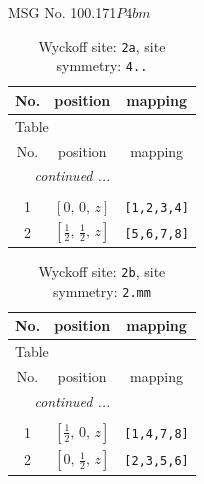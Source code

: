 \documentclass[fleqn,8pt]{jsarticle}
\begin{document}
\setcounter{MaxMatrixCols}{32}

\renewcommand{\tablename}{Table~}
\renewcommand{\figurename}{Figure~}
\begin{center}
\LARGE
MSG No. 100.171\quad$P4bm$
\end{center}
\renewcommand{\arraystretch}{1.2}
\begin{longtable}{ccc}
\caption{Wyckoff site: {\tt 2a}, site symmetry: {\tt 4..}}
 \\
 \hline \hline
No. & position & mapping \\ \hline \endfirsthead

\multicolumn{2}{l}{\tablename\ \thetable{}} \\
 \hline \hline
No. & position & mapping \\ \hline \endhead

 \hline \hline
\multicolumn{2}{r}{\footnotesize\it continued ...} \\ \endfoot

 \hline \hline
\multicolumn{2}{r}{} \\ \endlastfoot

1 & $\left[ 0,\, 0,\, z \right]$ & {\tt [1,2,3,4]} \\ \hline
2 & $\left[ \frac{1}{2},\, \frac{1}{2},\, z \right]$ & {\tt [5,6,7,8]} \\
\end{longtable}
\renewcommand{\arraystretch}{1.2}
\begin{longtable}{ccc}
\caption{Wyckoff site: {\tt 2b}, site symmetry: {\tt 2.mm}}
 \\
 \hline \hline
No. & position & mapping \\ \hline \endfirsthead

\multicolumn{2}{l}{\tablename\ \thetable{}} \\
 \hline \hline
No. & position & mapping \\ \hline \endhead

 \hline \hline
\multicolumn{2}{r}{\footnotesize\it continued ...} \\ \endfoot

 \hline \hline
\multicolumn{2}{r}{} \\ \endlastfoot

1 & $\left[ \frac{1}{2},\, 0,\, z \right]$ & {\tt [1,4,7,8]} \\ \hline
2 & $\left[ 0,\, \frac{1}{2},\, z \right]$ & {\tt [2,3,5,6]} \\
\end{longtable}
\renewcommand{\arraystretch}{1.2}
\end{document}
